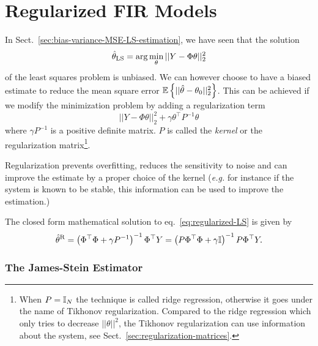 \chapter{Regularized FIR Models}
\label{chap:regularised-FIR-models}

In Sect.~\ref{sec:bias-variance-MSE-LS-estimation}, we have seen that the solution
\begin{equation*}
  \hat{\theta}_\textrm{LS} = \arg\min_\theta ||Y-\Phi \theta||_2^2
\end{equation*}
of the least squares problem is unbiased. We can however choose to have a biased estimate to reduce the mean square error $\mathbb{E}\left\{||\hat{\theta}-\theta_0||_2^2\right\}$. This can be achieved if we modify the minimization problem by adding a regularization term
\begin{equation}
  \label{eq:regularized-LS}
  ||Y-\Phi \theta||_2^2 + \gamma \theta^\top P^{-1}\theta
\end{equation}
where $\gamma P^{-1}$ is a positive definite matrix. $P$ is called the \emph{kernel} or the regularization matrix\footnote{When $P=\mathbb{I}_N$ the technique is called ridge regression, otherwise it goes under the name of Tikhonov regularization. Compared to the ridge regression which only tries to decrease $||\theta||^2$, the Tikhonov regularization can use information about the system, see Sect.~\ref{sec:regularization-matrices}.}.

Regularization prevents overfitting, reduces the sensitivity to noise and can improve the estimate by a proper choice of the kernel (\textit{e.g.} for instance if the system is known to be stable, this information can be used to improve the estimation.)


The closed form mathematical solution to eq.~\eqref{eq:regularized-LS} is given by
\begin{equation}
  \label{eq:regularized-LS-solution}
  \hat{\theta}^\textrm{R} = \left(\Phi^\top\Phi + \gamma P^{-1}\right)^{-1}\Phi^\top Y = \left(P\Phi^\top\Phi + \gamma\mathbb{I} \right)^{-1}P\Phi^\top Y.
\end{equation}

\subsection{The James-Stein Estimator}
\label{sec:james-stein-estimator}


